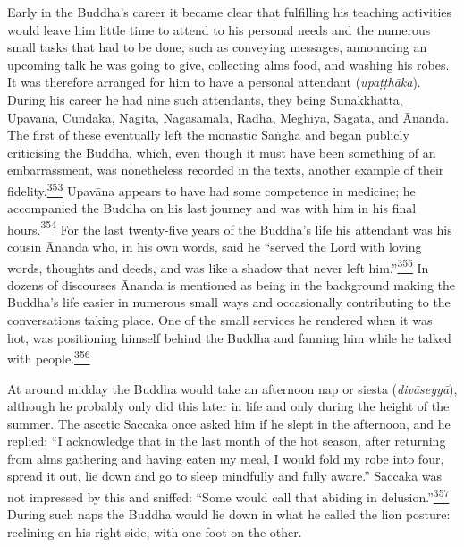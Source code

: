 Early in the Buddha's career it became clear that fulfilling his
teaching activities would leave him little time to attend to his
personal needs and the numerous small tasks that had to be done, such as
conveying messages, announcing an upcoming talk he was going to give,
collecting alms food, and washing his robes. It was therefore arranged
for him to have a personal attendant (\emph{upaṭṭhāka}). During his
career he had nine such attendants, they being Sunakkhatta, Upavāna,
Cundaka, Nāgita, Nāgasamāla, Rādha, Meghiya, Sagata, and Ānanda. The
first of these eventually left the monastic Saṅgha and began publicly
criticising the Buddha, which, even though it must have been something
of an embarrassment, was nonetheless recorded in the texts, another
example of their
fidelity.\label{footprints_split_011.html_fnref353}\hyperref[footprints_split_024.htmlux5cux23fn353]{\textsuperscript{353}}
Upavāna appears to have had some competence in medicine; he accompanied
the Buddha on his last journey and was with him in his final
hours.\label{footprints_split_011.html_fnref354}\hyperref[footprints_split_024.htmlux5cux23fn354]{\textsuperscript{354}}
For the last twenty-five years of the Buddha's life his attendant was
his cousin Ānanda who, in his own words, said he ``served the Lord with
loving words, thoughts and deeds, and was like a shadow that never left
him.''\label{footprints_split_011.html_fnref355}\hyperref[footprints_split_024.htmlux5cux23fn355]{\textsuperscript{355}}
In dozens of discourses Ānanda is mentioned as being in the background
making the Buddha's life easier in numerous small ways and occasionally
contributing to the conversations taking place. One of the small
services he rendered when it was hot, was positioning himself behind the
Buddha and fanning him while he talked with
people.\label{footprints_split_011.html_fnref356}\hyperref[footprints_split_024.htmlux5cux23fn356]{\textsuperscript{356}}

At around midday the Buddha would take an afternoon nap or siesta
(\emph{divāseyyā}), although he probably only did this later in life and
only during the height of the summer. The ascetic Saccaka once asked him
if he slept in the afternoon, and he replied: ``I acknowledge that in
the last month of the hot season, after returning from alms gathering
and having eaten my meal, I would fold my robe into four, spread it out,
lie down and go to sleep mindfully and fully aware.'' Saccaka was not
impressed by this and sniffed: ``Some would call that abiding in
delusion.''\label{footprints_split_011.html_fnref357}\hyperref[footprints_split_024.htmlux5cux23fn357]{\textsuperscript{357}}
During such naps the Buddha would lie down in what he called the lion
posture: reclining on his right side, with one foot on the other.

